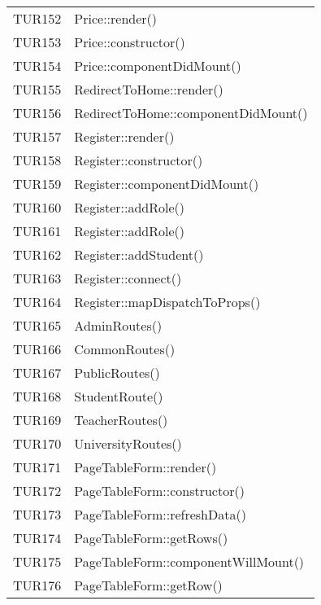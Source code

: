 \documentclass[PianoDiQualifica.tex]{subfiles}
\begin{document}
\begin{longtable}[H]{P{5cm}P{9cm}}
	TUR152 & Price::render() \\ 
	TUR153 & Price::constructor() \\ 
	TUR154 & Price::componentDidMount() \\ 
	TUR155 & RedirectToHome::render() \\ 
	TUR156 & RedirectToHome::componentDidMount() \\ 
	TUR157 & Register::render() \\ 
	TUR158 & Register::constructor() \\ 
	TUR159 & Register::componentDidMount() \\ 
	TUR160 & Register::addRole() \\ 
	TUR161 & Register::addRole() \\ 
	TUR162 & Register::addStudent() \\ 
	TUR163 & Register::connect() \\ 
	TUR164 & Register::mapDispatchToProps() \\ 
	TUR165 & AdminRoutes() \\ 
	TUR166 & CommonRoutes() \\ 
	TUR167 & PublicRoutes() \\ 
	TUR168 & StudentRoute() \\ 
	TUR169 & TeacherRoutes() \\ 
	TUR170 & UniversityRoutes() \\ 
	TUR171 & PageTableForm::render() \\ 
	TUR172 & PageTableForm::constructor() \\ 
	TUR173 & PageTableForm::refreshData() \\ 
	TUR174 & PageTableForm::getRows() \\ 
	TUR175 & PageTableForm::componentWillMount() \\ 
	TUR176 & PageTableForm::getRow() \\
	

\end{longtable}
\end{document}

